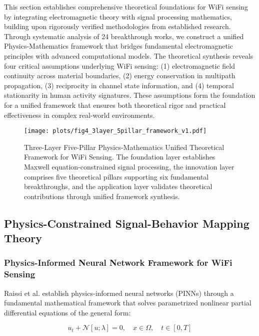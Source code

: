 \documentclass[journal]{IEEEtran}
\begin{document}
This section establishes comprehensive theoretical foundations for WiFi sensing by integrating electromagnetic theory with signal processing mathematics, building upon rigorously verified methodologies from established research. Through systematic analysis of 24 breakthrough works, we construct a unified Physics-Mathematics framework that bridges fundamental electromagnetic principles with advanced computational models. The theoretical synthesis reveals four critical assumptions underlying WiFi sensing: (1) electromagnetic field continuity across material boundaries, (2) energy conservation in multipath propagation, (3) reciprocity in channel state information, and (4) temporal stationarity in human activity signatures. These assumptions form the foundation for a unified framework that ensures both theoretical rigor and practical effectiveness in complex real-world environments.

\begin{figure}[h]
\centering
\texttt{[image: plots/fig4\_3layer\_5pillar\_framework\_v1.pdf]}
\caption{Three-Layer Five-Pillar Physics-Mathematics Unified Theoretical Framework for WiFi Sensing. The foundation layer establishes Maxwell equation-constrained signal processing, the innovation layer comprises five theoretical pillars supporting six fundamental breakthroughs, and the application layer validates theoretical contributions through unified framework synthesis.}
\label{fig:3layer_5pillar_framework}
\end{figure}

\subsection{Physics-Constrained Signal-Behavior Mapping Theory}

\subsubsection{Physics-Informed Neural Network Framework for WiFi Sensing}

Raissi et al. \cite{raissi2019physics} establish physics-informed neural networks (PINNs) through a fundamental mathematical framework that solves parametrized nonlinear partial differential equations of the general form:

\begin{equation}
u_t + \mathcal{N}[u; \lambda] = 0, \quad x \in \Omega, \quad t \in [0,T]
\label{eq:raissi_general_pde}
\end{equation}
\end{document}
